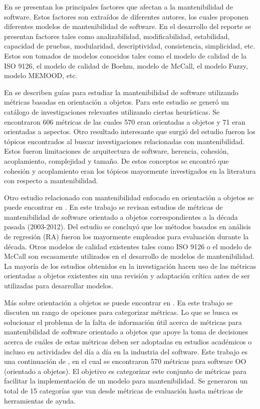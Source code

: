 En \cite{survey} se presentan los principales factores que afectan a la mantenibilidad de
software. Estos factores son extraídos de diferentes autores, los cuales
proponen diferentes modelos de mantenibilidad de software.
En el desarrollo del reporte se presentan factores tales como
analizabilidad, modificabilidad, estabilidad, capacidad de pruebas, modularidad,
descriptividad, consistencia, simplicidad, etc. Estos son tomados de modelos
conocidos tales como el modelo de calidad de la ISO 9126, el modelo de calidad
de Boehm, modelo de McCall, el modelo Fuzzy, modelo MEMOOD, etc.

En \cite{roadmap} se describen guías para estudiar la mantenibilidad de software
utilizando métricas basadas en orientación a objetos. Para este estudio
se generó un catálogo de investigaciones relevantes utilizando
ciertas heurísticas. Se encontraron 606 métricas de las cuales 570 eran
orientadas a objetos y 71 eran orientadas a aspectos. Otro resultado
interesante que surgió del estudio fueron los tópicos encontrados al buscar
investigaciones relacionadas con mantenibilidad. Estos fueron limitaciones
de arquitectura de software, herencia, cohesión, acoplamiento, complejidad
y tamaño. De estos conceptos se encontró que cohesión y acoplamiento eran
los tópicos mayormente investigados en la literatura con respecto a mantenibilidad.

Otro estudio relacionado con mantenibilidad enfocado en orientación a objetos
se puede encontrar en \cite{pastDecade}. En este trabajo se revisan estudios
de métricas de mantenibilidad de software orientado a objetos correspondientes
a la década pasada (2003-2012). Del estudio se concluyó que los métodos
basados en análisis de regresión (RA) fueron los mayormente empleados para
evaluación durante la década. Otros modelos de calidad existentes tales como
ISO 9126 o el modelo de McCall son escasamente utilizados en el desarrollo
de modelos de mantenibilidad. La mayoría de los estudios obtenidos en la investigación
hacen uso de las métricas orientadas a objetos existentes sin una revisión
y adaptación crítica antes de ser utilizadas para desarrollar modelos.

Más sobre orientación a objetos se puede encontrar en \cite{TowardsACatalog}.
En este trabajo se discuten un rango de opciones para categorizar métricas.
Lo que se busca es solucionar el problema de la falta de información útil
acerca de métricas para mantenibilidad de software orientado a objetos que
apoye la toma de decisiones acerca de cuáles de estas métricas deben ser
adoptadas en estudios académicos o incluso en actividades del día a día en la
industria del software. Este trabajo es una continuación de \cite{roadmap},
en el cual se encontraron 570 métricas para software OO (orientado a objetos). El objetivo es
categorizar este conjunto de métricas para facilitar la implementación de un
modelo para mantenibilidad. Se generaron un total de 15 categorías que van
desde métricas de evaluación hasta métricas de herramientas de ayuda.

